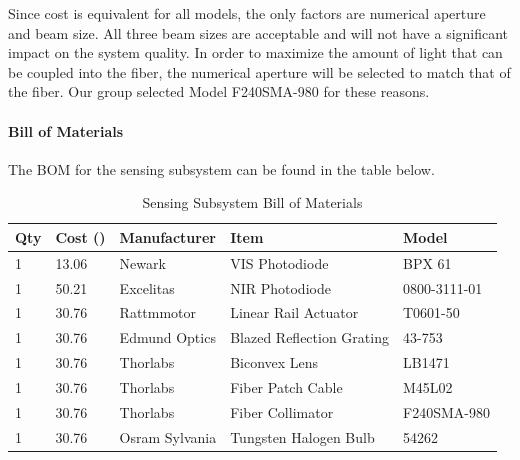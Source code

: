 Since cost is equivalent for all models, the only factors are numerical aperture and beam size. All three beam sizes are acceptable and will not have a significant impact on the system quality. In order to maximize the amount of light that can be coupled into the fiber, the numerical aperture will be selected to match that of the fiber. Our group selected Model F240SMA-980 for these reasons.

\paragraph{Bill of Materials}
The BOM for the sensing subsystem can be found in the table below.

\begin{table}[H]
	\centering
	\label{table:SensingBOM}
	\caption{Sensing Subsystem Bill of Materials}
	\bigskip
	\begin{tabular}{|p{2cm}|p{2.5cm}|p{2cm}|p{2.75cm}|p{1.75cm}|}
	\hline
	Qty & Cost (\textdollar) & Manufacturer & Item & Model\\
	\hline
	1 & 13.06 & Newark & VIS Photodiode & BPX 61\\
	\hline
	1 & 50.21 & Excelitas & NIR Photodiode & 0800-3111-01\\
	\hline
	1 & 30.76 & Rattmmotor & Linear Rail Actuator & T0601-50\\
	\hline
	1 & 30.76 & Edmund Optics & Blazed Reflection Grating & 43-753\\
	\hline
	1 & 30.76 & Thorlabs & Biconvex Lens & LB1471\\
	\hline
	1 & 30.76 & Thorlabs & Fiber Patch Cable & M45L02\\
	\hline
	1 & 30.76 & Thorlabs & Fiber Collimator & F240SMA-980\\
	\hline
	1 & 30.76 & Osram Sylvania & Tungsten Halogen Bulb & 54262\\
	\hline
	\end{tabular}
\end{table}